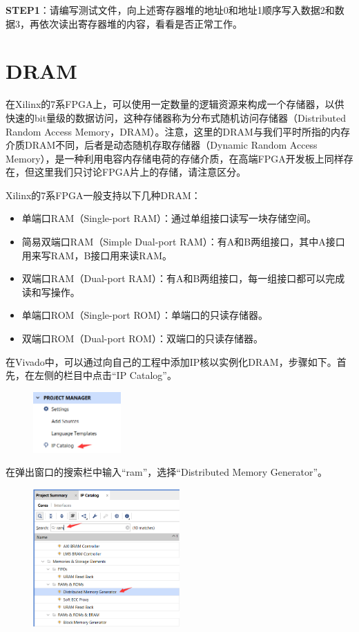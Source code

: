 \documentclass{ctexart}
\begin{document}
\textbf{STEP1}：请编写测试文件，向上述寄存器堆的地址0和地址1顺序写入数据2和数据3，再依次读出寄存器堆的内容，看看是否正常工作。


\section{DRAM}

在Xilinx的7系FPGA上，可以使用一定数量的逻辑资源来构成一个存储器，以供快速的bit量级的数据访问，这种存储器称为分布式随机访问存储器（Distributed Random Access Memory，DRAM）。注意，这里的DRAM与我们平时所指的内存介质DRAM不同，后者是动态随机存取存储器（Dynamic Random Access Memory），是一种利用电容内存储电荷的存储介质，在高端FPGA开发板上同样存在，但这里我们只讨论FPGA片上的存储，请注意区分。

Xilinx的7系FPGA一般支持以下几种DRAM：
\begin{itemize}
    \item 单端口RAM（Single-port RAM）：通过单组接口读写一块存储空间。
    \item 简易双端口RAM（Simple Dual-port RAM）：有A和B两组接口，其中A接口用来写RAM，B接口用来读RAM。
    \item 双端口RAM（Dual-port RAM）：有A和B两组接口，每一组接口都可以完成读和写操作。
    \item 单端口ROM（Single-port ROM）：单端口的只读存储器。
    \item 双端口ROM（Dual-port ROM）：双端口的只读存储器。
\end{itemize}

在Vivado中，可以通过向自己的工程中添加IP核以实例化DRAM，步骤如下。首先，在左侧的栏目中点击“IP Catalog”。

\begin{figure}[H]
    \centering
    \includegraphics[width=0.3\textwidth]{lab3/4.png}
\end{figure}

在弹出窗口的搜索栏中输入“ram”，选择“Distributed Memory Generator”。

\begin{figure}[H]
    \centering
    \includegraphics[width=0.5\textwidth]{lab3/5.png}
\end{figure}
\end{document}
